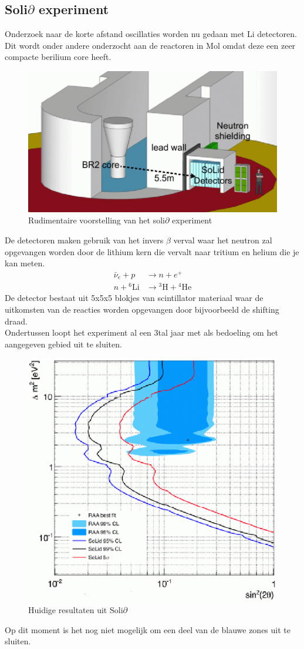 \documentclass[../main.tex]{subfiles}
\begin{document}
\subsection{Soli$\partial$ experiment}%
\label{sub:soli_partial_experiment}

Onderzoek naar de korte afstand oscillaties worden nu gedaan met Li detectoren. Dit wordt onder andere onderzocht aan de reactoren in Mol omdat deze een zeer compacte berilium core heeft.

\begin{figure}[h]
    \centering
    \includegraphics[width=0.3\linewidth]{neutrinos/voorstelling_solid_experiment.png}
    \caption{Rudimentaire voorstelling van het soli$\partial$ experiment}%
    \label{fig:neutrinos/voorstelling_solid_experiment}
\end{figure}

De detectoren maken gebruik van het invers $\beta$ verval waar het neutron zal opgevangen worden door de lithium kern die vervalt naar tritium en helium die je kan meten.
\begin{equation}
    \begin{aligned}
        \label{eq:li_det_interactie}
        \bar{\nu}_{e}+p &\rightarrow n+e^{+}\\
        n+{ }^{6} \mathrm{Li} &\rightarrow{ }^{3} \mathrm{H}+{ }^{4} \mathrm{He}
    \end{aligned}
\end{equation}
De detector bestaat uit 5x5x5 blokjes van scintillator materiaal waar de uitkomsten van de reacties worden opgevangen door bijvoorbeeld de shifting draad.\\
Ondertussen loopt het experiment al een 3tal jaar met als bedoeling om het aangegeven gebied uit te sluiten.
\begin{figure}[h]
    \centering
    \includegraphics[width=0.5\linewidth]{neutrinos/solid_resultaten.png}
    \caption{Huidige resultaten uit Soli$\partial$}%
    \label{fig:neutrinos/solid_resultaten}
\end{figure}
Op dit moment is het nog niet mogelijk om een deel van de blauwe zones uit te sluiten.
\end{document}

